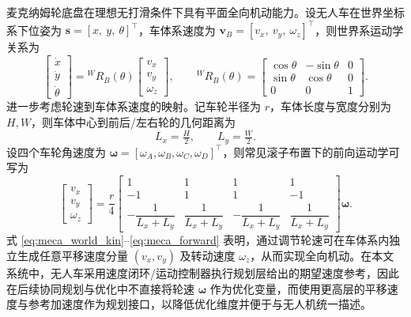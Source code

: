 麦克纳姆轮底盘在理想无打滑条件下具有平面全向机动能力。设无人车在世界坐标系下位姿为
\(\mathbf{s}=[x,\ y,\ \theta]^\top\)，车体系速度为
\(\mathbf{v}_B=[v_x,\ v_y,\ \omega_z]^\top\)，则世界系运动学关系为
\begin{equation}
\begin{bmatrix}
\dot x\\[2pt] \dot y\\[2pt] \dot\theta
\end{bmatrix}
=
{}^{W}\!R_{B}(\theta)
\begin{bmatrix}
v_x\\[2pt] v_y\\[2pt] \omega_z
\end{bmatrix},
\qquad
{}^{W}\!R_{B}(\theta)=
\begin{bmatrix}
\cos\theta & -\sin\theta & 0\\
\sin\theta &  \cos\theta & 0\\
0          &  0          & 1
\end{bmatrix}.
\label{eq:meca_world_kin}
\end{equation}
进一步考虑轮速到车体系速度的映射。记车轮半径为 \(r\)，车体长度与宽度分别为 \(H,W\)，则车体中心到前后/左右轮的几何距离为
\begin{equation}
L_x=\tfrac{H}{2},\qquad L_y=\tfrac{W}{2}.
\label{eq:meca_geom}
\end{equation}
设四个车轮角速度为
\(\boldsymbol{\omega}=[\omega_A,\omega_B,\omega_C,\omega_D]^\top\)，则常见滚子布置下的前向运动学可写为
\begin{equation}
\begin{bmatrix}
v_x\\[2pt] v_y\\[2pt] \omega_z
\end{bmatrix}
=
\frac{r}{4}
\begin{bmatrix}
1 & 1 & 1 & 1\\[2pt]
-1 & 1 & 1 & -1\\[4pt]
-\dfrac{1}{L_x+L_y} & \dfrac{1}{L_x+L_y} & -\dfrac{1}{L_x+L_y} & \dfrac{1}{L_x+L_y}
\end{bmatrix}
\boldsymbol{\omega}.
\label{eq:meca_forward}
\end{equation}
式 \eqref{eq:meca_world_kin}--\eqref{eq:meca_forward} 表明，通过调节轮速可在车体系内独立生成任意平移速度分量 \((v_x,v_y)\) 及转动速度 \(\omega_z\)，从而实现全向机动。在本文系统中，无人车采用速度闭环/运动控制器执行规划层给出的期望速度参考，因此在后续协同规划与优化中不直接将轮速 \(\boldsymbol{\omega}\) 作为优化变量，而使用更高层的平移速度与参考加速度作为规划接口，以降低优化维度并便于与无人机统一描述。

